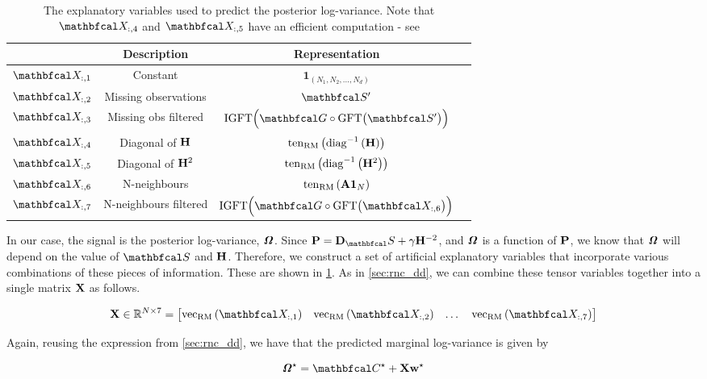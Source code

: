 \begin{table}[t]
    \renewcommand{\arraystretch}{1.7}
    \centering
    \begin{tabular}{|c|c|c|c|}
    \hline
     & \textbf{Description} & \textbf{Representation}\\
    \hline
    $\Xt_{:,1}$ &  Constant & $\mathbf{1}_{(N_1, N_2, ..., N_d)}$ \\
    \hline
    $\Xt_{:,2}$ & Missing observations & $\St'$  \\
    \hline
    $\Xt_{:,3}$ & Missing obs filtered & $\text{IGFT} \Big(\Gt \circ \text{GFT}\big(\St'\big)\Big)$ \\
    \hline 
    $\Xt_{:,4}$ &  Diagonal of $\mathbf{H}$ & $\text{\textup{ten}}_{\text{\textup{RM}}}\left(\text{\textup{diag}}^{-1}\left(\mathbf{H}\right)\right)$ \\
    \hline 
    $\Xt_{:,5}$ & Diagonal of $\mathbf{H}^2$ & $\text{\textup{ten}}_{\text{\textup{RM}}}\left(\text{\textup{diag}}^{-1}\left(\mathbf{H}^2\right)\right)$ \\
    \hline
    $\Xt_{:,6}$ &  N-neighbours & $\text{\textup{ten}}_{\text{\textup{RM}}}\left(\mathbf{A} \mathbf{1}_N\right)$\\
    \hline
    $\Xt_{:,7}$  & N-neighbours filtered &  $\text{IGFT} \Big(\Gt \circ \text{GFT}\big(\Xt_{:,6}\big)\Big)$ \\
    \hline
\end{tabular}
\caption{\small{The explanatory variables used to predict the posterior log-variance. Note that $\Xt_{:,4}$ and $\Xt_{:,5}$ have an efficient computation - see }}
\label{tab:post_cov_features}
\end{table}


In our case, the signal is the posterior log-variance, $\bm{\mathit{\Omega}}$. Since $\PP = \D_\St + \gamma \HH^{-2}$, and $\bm{\mathit{\Omega}}$ is a function of $\mathbf{P}$, we know that $\bm{\mathit{\Omega}}$ will depend on the value of $\St$ and $\mathbf{H}$. Therefore, we construct a set of artificial explanatory variables that incorporate various combinations of these pieces of information. These are shown in \cref{tab:post_cov_features}. As in \cref{sec:rnc_dd}, we can combine these tensor variables together into a single matrix $\mathbf{X}$ as follows. 

\begin{equation}
    \X \in \R^{N \times 7} = \begin{bmatrix} \vecrm{\Xt_{:, 1}} & \vecrm{\Xt_{:, 2}} & \dots & \vecrm{\Xt_{:, 7}} \end{bmatrix}    
\end{equation}

Again, reusing the expression from \cref{sec:rnc_dd}, we have that the predicted marginal log-variance is given by 

\begin{equation}
    \Omegat^\star = \Ct^\star + \X \w^\star
\end{equation}

